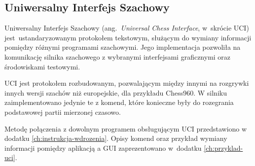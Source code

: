 \subsection{Uniwersalny Interfejs Szachowy}
\label{subsec:interfejs-szachowy}

Uniwersalny Interfejs Szachowy (ang.~\emph{Universal Chess Interface}, w~skrócie UCI) \cite*{UCIdoc} jest~ustandaryzowanym protokołem tekstowym, służącym do wymiany informacji pomiędzy różnymi programami szachowymi.
Jego implementacja pozwoliła na komunikację silnika szachowego z wybranymi interfejsami graficznymi oraz środowiskami testowymi.

UCI jest protokołem rozbudowanym, pozwalającym między innymi na rozgrywki innych wersji szachów niż europejskie, dla przykładu Chess960.
W silniku zaimplementowano jedynie te z komend, które konieczne były do rozegrania podstawowej partii mierzonej czasowo.


Metodę połączenia z dowolnym programem obsługującym UCI przedstawiono w dodatku \ref{ch:instrukcja-wdrozenia}.
Opisy komend oraz przykład wymiany informacji pomiędzy aplikacją a GUI zaprezentowano w~dodatku \ref{ch:przyklad-uci}.